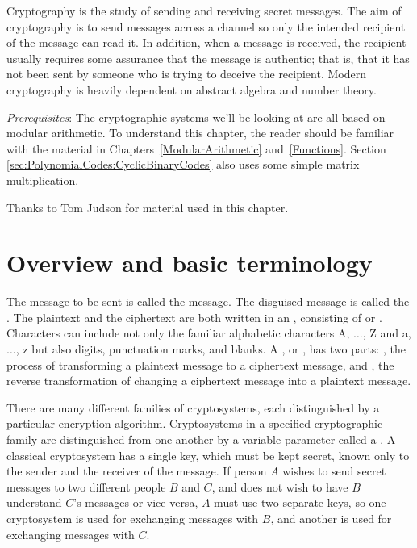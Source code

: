 
Cryptography is the study of sending and receiving secret messages.
The aim of cryptography is to send messages across a channel so only
the intended recipient of the message can read it. In addition, when a
message is received, the recipient usually requires some assurance that
the message is authentic; that is, that it has not been sent by
someone who is trying to deceive the recipient. Modern cryptography is
heavily dependent on abstract algebra and number theory. 
\medskip

\noindent
\emph{Prerequisites}: The cryptographic systems we'll be looking at are all based on modular arithmetic.
To understand this chapter, the reader should be familiar with the material in  Chapters~\ref{ModularArithmetic} and~\ref{Functions}. Section \ref{sec:PolynomialCodes:CyclicBinaryCodes} also uses some simple matrix multiplication.
\bigskip

Thanks to Tom Judson for material used in this chapter.

\section{Overview and basic terminology}
\label{sec:Cryptography:Overview}

The message to be sent is called the  message. The disguised message is called
the . The plaintext and the
ciphertext are both written in an , consisting of  or . Characters can include not only the
familiar alphabetic characters A, $\ldots$, Z and a, $\ldots$, z but
also digits, punctuation marks, and blanks. A , or ,  has two parts: , the process
of transforming a plaintext message to a ciphertext message, and , the reverse transformation of changing a ciphertext
message into a plaintext message.
 
 
There are many different families of cryptosystems, each distinguished
by a particular encryption algorithm. Cryptosystems in a specified
cryptographic family are distinguished from one another by a variable parameter
called a . A classical cryptosystem has a single key, which must be kept
secret,  known only to the sender and the receiver of the message. If
person $A$ wishes to send secret messages to two different people $B$
and $C$, and does not wish to have $B$ understand $C$'s messages or
vice versa, $A$ must use two separate keys, so one cryptosystem is
used for exchanging messages with $B$, and another is used for
exchanging messages with $C$.
 
